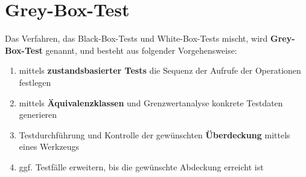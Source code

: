 \section{Grey-Box-Test}

\begin{tcolorbox}[title=Grey-Box-Test]
    Das Verfahren, das Black-Box-Tests und White-Box-Tests mischt, wird \textbf{Grey-Box-Test} genannt, und besteht aus folgender Vorgehensweise:
    \begin{enumerate}
        \item mittels \textbf{zustandsbasierter Tests} die Sequenz der Aufrufe der Operationen festlegen
        \item mittels \textbf{Äquivalenzklassen}  und Grenzwertanalyse konkrete Testdaten generieren
        \item Testdurchführung und Kontrolle der gewünschten \textbf{Überdeckung} mittels eines Werkzeugs
        \item ggf. Testfälle erweitern, bis die gewünschte Abdeckung erreicht ist
    \end{enumerate}
\end{tcolorbox}